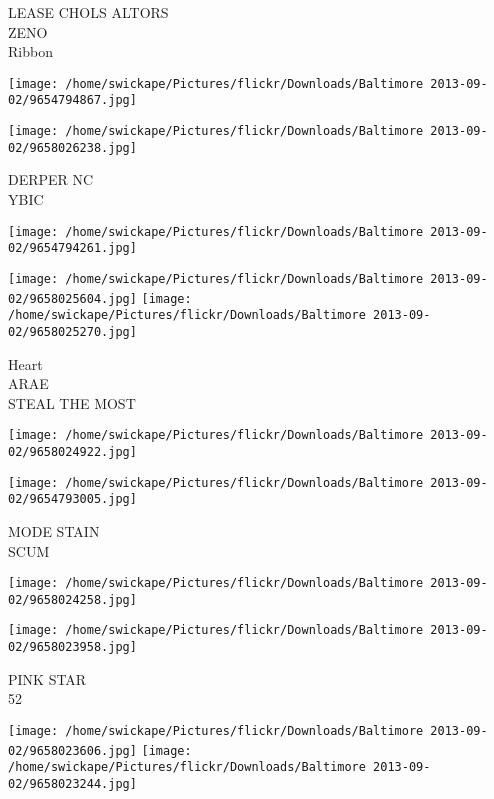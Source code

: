 \documentclass[10pt,letterpaper]{article}
\begin{document}
LEASE CHOLS ALTORS\\
ZENO\\
Ribbon\\
\pagebreak

\texttt{[image: /home/swickape/Pictures/flickr/Downloads/Baltimore 2013-09-02/9654794867.jpg]}

\vspace{0.25in}
\texttt{[image: /home/swickape/Pictures/flickr/Downloads/Baltimore 2013-09-02/9658026238.jpg]}

DERPER NC\\
YBIC\\
\pagebreak

\texttt{[image: /home/swickape/Pictures/flickr/Downloads/Baltimore 2013-09-02/9654794261.jpg]}

\vspace{0.25in}
\texttt{[image: /home/swickape/Pictures/flickr/Downloads/Baltimore 2013-09-02/9658025604.jpg]}
\texttt{[image: /home/swickape/Pictures/flickr/Downloads/Baltimore 2013-09-02/9658025270.jpg]}

Heart\\
ARAE\\
STEAL THE MOST\\
\pagebreak

\texttt{[image: /home/swickape/Pictures/flickr/Downloads/Baltimore 2013-09-02/9658024922.jpg]}

\vspace{0.25in}
\texttt{[image: /home/swickape/Pictures/flickr/Downloads/Baltimore 2013-09-02/9654793005.jpg]}

MODE STAIN\\
SCUM\\
\pagebreak

\texttt{[image: /home/swickape/Pictures/flickr/Downloads/Baltimore 2013-09-02/9658024258.jpg]}

\vspace{0.25in}
\texttt{[image: /home/swickape/Pictures/flickr/Downloads/Baltimore 2013-09-02/9658023958.jpg]}

PINK STAR\\
52\\
\pagebreak

\texttt{[image: /home/swickape/Pictures/flickr/Downloads/Baltimore 2013-09-02/9658023606.jpg]}
\texttt{[image: /home/swickape/Pictures/flickr/Downloads/Baltimore 2013-09-02/9658023244.jpg]}
\end{document}

